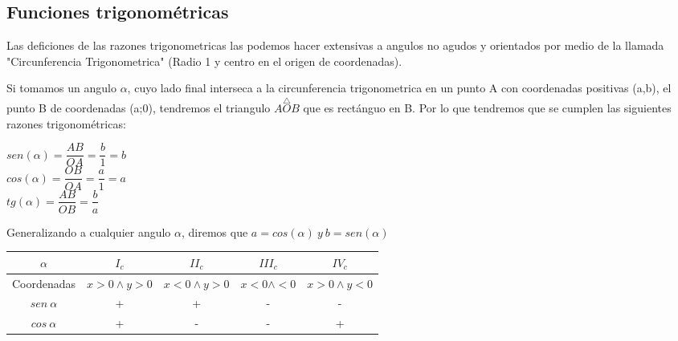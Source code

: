 \documentclass[10pt]{article}
\begin{document}
\subsection{Funciones trigonométricas}
Las deficiones de las razones trigonometricas las podemos hacer extensivas a angulos no agudos y orientados por medio de la llamada "Circunferencia Trigonometrica" (Radio 1 y centro en el origen de coordenadas).
\begin{multicols}{2}

Si tomamos un angulo $\alpha$, cuyo lado final interseca a la circunferencia trigonometrica en un punto A con coordenadas positivas (a,b), el punto B de coordenadas (a;0), tendremos el triangulo \(\overset{\triangle}{AOB}\) que es rectánguo en B. Por lo que tendremos que se cumplen las siguientes razones trigonométricas:
\end{multicols}
\begin{multicols}{3}
$sen(\alpha) = \dfrac{AB}{OA} = \dfrac{b}{1} = b$\\
$cos(\alpha) = \dfrac{OB}{OA} = \dfrac{a}{1} = a$\\
$tg(\alpha) = \dfrac{AB}{OB} = \dfrac{b}{a}$
\end{multicols}
Generalizando a cualquier angulo $\alpha$, diremos que $a=cos(\alpha)\ y\ b=sen(\alpha)$
\begin{table}[h]
\begin{center}
\begin{tabular}{|c|c|c|c|c|}
\hline
$\alpha$&$I_c$&$II_c$&$III_c$&$IV_c$\\
\hline
Coordenadas&$x>0 \land y>0$&$x<0 \land y>0$&$x<0 \land <0$&$x>0 \land y<0$\\
\hline
$sen\ \alpha$&+&+&-&-\\
\hline
$cos\ \alpha$&+&-&-&+\\
\hline
\end{tabular}
\end{center}
\end{table}
\end{document}

